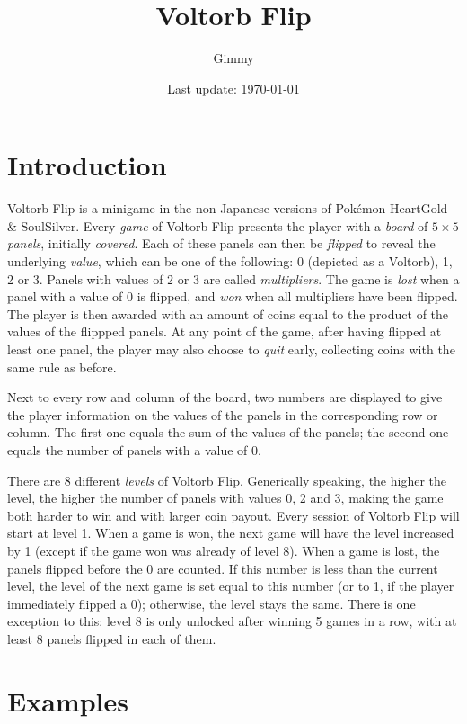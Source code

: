 \documentclass[a4paper,12pt]{article}
\title{Voltorb Flip}
\date{Last update: \today}
\author{Gimmy}
\begin{document}
\maketitle

\section{Introduction}

Voltorb Flip is a minigame in the non-Japanese versions of Pokémon HeartGold \& SoulSilver. Every \emph{game} of Voltorb Flip presents the player with a \emph{board} of $5\times5$ \emph{panels}, initially \emph{covered}. Each of these panels can then be \emph{flipped} to reveal the underlying \emph{value}, which can be one of the following: 0 (depicted as a Voltorb), 1, 2 or 3. Panels with values of 2 or 3 are called \emph{multipliers}. The game is \emph{lost} when a panel with a value of 0 is flipped, and \emph{won} when all multipliers have been flipped. The player is then awarded with an amount of coins equal to the product of the values of the flippped panels. At any point of the game, after having flipped at least one panel, the player may also choose to \emph{quit} early, collecting coins with the same rule as before.

Next to every row and column of the board, two numbers are displayed to give the player information on the values of the panels in the corresponding row or column. The first one equals the sum of the values of the panels; the second one equals the number of panels with a value of 0.

There are 8 different \emph{levels} of Voltorb Flip. Generically speaking, the higher the level, the higher the number of panels with values 0, 2 and 3, making the game both harder to win and with larger coin payout. Every session of Voltorb Flip will start at level 1. When a game is won, the next game will have the level increased by 1 (except if the game won was already of level 8). When a game is lost, the panels flipped before the 0 are counted. If this number is less than the current level, the level of the next game is set equal to this number (or to 1, if the player immediately flipped a 0); otherwise, the level stays the same. There is one exception to this: level 8 is only unlocked after winning 5 games in a row, with at least 8 panels flipped in each of them.

\section{Examples}
\end{document}
